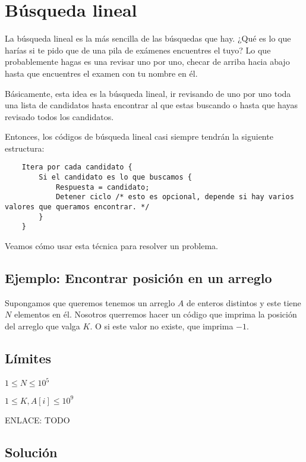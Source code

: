 \section{Búsqueda lineal}
La búsqueda lineal es la más sencilla de las búsquedas que hay. ¿Qué es lo que harías si te pido que de una pila de exámenes encuentres el tuyo? Lo que probablemente hagas es una revisar uno por uno, checar de arriba hacia abajo hasta que encuentres el examen con tu nombre en él.

Básicamente, esta idea es la búsqueda lineal, ir revisando de uno por uno toda una lista de candidatos hasta encontrar al que estas buscando o hasta que hayas revisado todos los candidatos.

Entonces, los códigos de búsqueda lineal casi siempre tendrán la siguiente estructura:

\begin{lstlisting}
	Itera por cada candidato {
		Si el candidato es lo que buscamos {
			Respuesta = candidato;
			Detener ciclo /* esto es opcional, depende si hay varios valores que queramos encontrar. */
		}
	}	
\end{lstlisting}

Veamos cómo usar esta técnica para resolver un problema.

\subsection{Ejemplo: Encontrar posición en un arreglo}

Supongamos que queremos tenemos un arreglo \(A\) de enteros distintos y este tiene \(N\) elementos en él. Nosotros querremos hacer un código que imprima la posición del arreglo que valga \(K\). O si este valor no existe, que imprima \(-1\).

\subsection*{Límites}
\begin{plimits}
	\item \(1\leq N \leq 10^5\)
	\item \(1\leq K,A[i] \leq 10^9\)
\end{plimits}

ENLACE: TODO

\subsection*{Solución}

